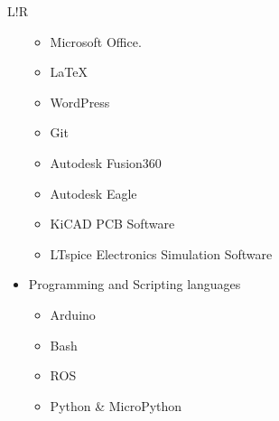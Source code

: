 \documentclass[a4paper]{article}
\newcommand\VRule{\color{lightgray}\vrule width 0.5pt}
\begin{document}
\begin{tabularx}{\textwidth}{L!{\VRule}R}
\begin{itemize}
\begin{itemize}
            \item Microsoft Office.
            \item LaTeX
            \item WordPress
            \item Git
            \item Autodesk Fusion360
            \item Autodesk Eagle
            \item KiCAD PCB Software
            \item LTspice Electronics Simulation Software
        \end{itemize}
        \item Programming and Scripting languages
        \begin{itemize}
            \item Arduino
            \item Bash
            \item ROS
            \item Python \& MicroPython
        \end{itemize}   
    \end{itemize}
\end{tabularx}
\end{document}
